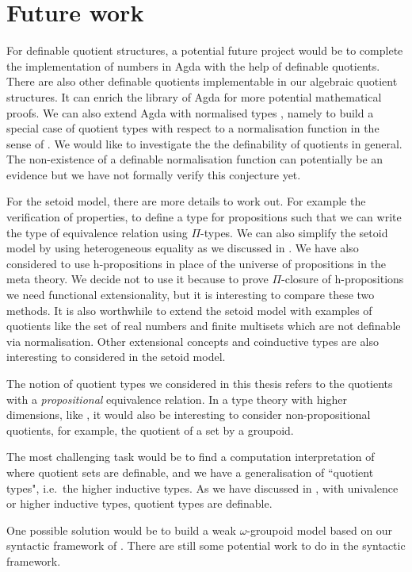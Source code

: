 \section{Future work}

For definable quotient structures, a potential future project would be to complete the implementation of numbers in Agda with the help of definable quotients. There are also other definable quotients implementable in our algebraic quotient structures. It can enrich the library of Agda for more potential mathematical proofs. We can also extend Agda with normalised types \cite{cou:01}, namely to build a special case of quotient types with respect to a normalisation function in the sense of . 
We would like to investigate the the definability of quotients in general. The non-existence of a definable normalisation function can potentially be an evidence but we have not formally verify this conjecture yet. 


For the setoid model, there are more details to work out. For example the verification of properties, to define a type for propositions such that we can write the type of equivalence relation using $\Pi$-types. We can also simplify the setoid model by using heterogeneous equality as we discussed in . We have also considered to use h-propositions in place of the universe of propositions in the meta theory. We decide not to use it because to prove $\Pi$-closure of h-propositions we need functional extensionality, but it is interesting to compare these two methods. It is also worthwhile to extend the setoid model with examples of quotients like the set of real numbers and finite multisets which are not definable via normalisation. 
Other extensional concepts and coinductive types are also interesting to considered in the setoid model.


The notion of quotient types we considered in this thesis refers to the quotients with a \emph{propositional} equivalence relation. In a type theory with higher dimensions, like \hott, it would also be interesting to consider non-propositional quotients, for example, the quotient of a set by a groupoid.


The most challenging task would be to find a computation interpretation of \hott where quotient sets are definable, and we have a generalisation of ``quotient types", i.e.\ the higher inductive types.
As we have discussed in \cite{qthott}, with univalence or higher inductive types, quotient types are definable.

One possible solution would be to build a weak $\omega$-groupoid model based on our syntactic framework of \wog. There are still some potential work to do in the syntactic framework.

